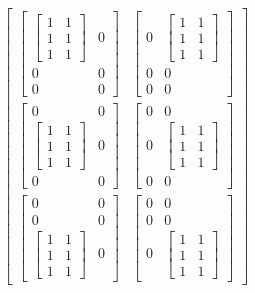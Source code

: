 \documentclass[11pt]{article}
\newcommand{\prompt}[4]{
        \ttfamily\llap{{\color{#2}[#3]:\hspace{3pt}#4}}\vspace{-\baselineskip}
    }
\begin{document}
\prompt{Out}{outcolor}{63}{}

    $\displaystyle \left[\begin{matrix}\left[\begin{matrix}\left[\begin{matrix}1 & 1\\1 & 1\\1 & 1\end{matrix}\right] & 0\\0 & 0\\0 & 0\end{matrix}\right] & \left[\begin{matrix}0 & \left[\begin{matrix}1 & 1\\1 & 1\\1 & 1\end{matrix}\right]\\0 & 0\\0 & 0\end{matrix}\right]\\\left[\begin{matrix}0 & 0\\\left[\begin{matrix}1 & 1\\1 & 1\\1 & 1\end{matrix}\right] & 0\\0 & 0\end{matrix}\right] & \left[\begin{matrix}0 & 0\\0 & \left[\begin{matrix}1 & 1\\1 & 1\\1 & 1\end{matrix}\right]\\0 & 0\end{matrix}\right]\\\left[\begin{matrix}0 & 0\\0 & 0\\\left[\begin{matrix}1 & 1\\1 & 1\\1 & 1\end{matrix}\right] & 0\end{matrix}\right] & \left[\begin{matrix}0 & 0\\0 & 0\\0 & \left[\begin{matrix}1 & 1\\1 & 1\\1 & 1\end{matrix}\right]\end{matrix}\right]\end{matrix}\right]$
\end{document}
